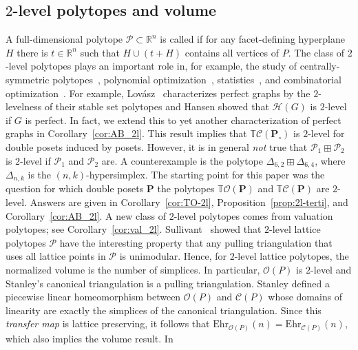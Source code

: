 \documentclass[11pt]{amsart}
\theoremstyle{definition}
\begin{document}
\subsection{$2$-level polytopes and volume}
A full-dimensional polytope ${\mathcal{P}} \subset {\mathbb{R}}^n$ is called
{\textbf{}} if for any facet-defining hyperplane $H$ there is $t
\in {\mathbb{R}}^n$ such that $H \cup (t + H)$ contains all vertices of ${P}$. The class
of $2$-level polytopes plays an important role in, for example, the study of
centrally-symmetric polytopes~\cite{WSZ,Hansen}, polynomial
optimization~\cite{GPT,gs14}, statistics~\cite{Sullivant}, and combinatorial
optimization~\cite{Schrijver}.  For
example, Lov\'{a}sz~\cite{Lovasz} characterizes perfect graphs by the
$2$-levelness of their stable set polytopes and Hansen showed that
${\mathcal{H}({G})}$ is $2$-level if $G$ is perfect. In fact, we extend this to yet
another characterization of perfect graphs in Corollary~\ref{cor:AB_2l}. This
result implies that ${{\mathbb{T}}{\mathcal{C}({{{{\mathbf{P}}_\circ}}})}}$ is $2$-level for double posets induced
by posets. However, it is in general \emph{not} true that
${{{{\mathcal{P}}_1} \boxplus {{\mathcal{P}}_2}}}$ is $2$-level if ${\mathcal{P}}_1$ and ${\mathcal{P}}_2$ are. A counterexample is the polytope
${{{\Delta_{6,2}} \boxplus {\Delta_{6,4}}}}$, where $\Delta_{n,k}$ is the
$(n,k)$-hypersimplex. The starting point for this paper was the question for
which double posets ${\mathbf{P}}$ the polytopes ${{\mathbb{T}}{\mathcal{O}({\mathbf{P}})}}$ and ${{\mathbb{T}}{\mathcal{C}({{{\mathbf{P}}}})}}$ are $2$-level.
Answers are given in Corollary~\ref{cor:TO-2l},
Proposition~\ref{prop:2l-terti}, and Corollary~\ref{cor:AB_2l}. A new class of
$2$-level polytopes comes from valuation polytopes; see
Corollary~\ref{cor:val_2l}. Sullivant~\cite[Thm.~2.4]{Sullivant} showed that
$2$-level lattice polytopes ${\mathcal{P}}$ have the interesting property that any
pulling triangulation that uses all lattice points in ${\mathcal{P}}$ is unimodular.
Hence, for $2$-level lattice polytopes, the normalized volume is the number of
simplices.  In particular, ${\mathcal{O}({P})}$ is $2$-level and Stanley's canonical
triangulation is a pulling triangulation. Stanley defined a piecewise linear
homeomorphism between ${\mathcal{O}({P})}$ and ${\mathcal{C}({P})}$ whose domains of linearity
are exactly the simplices of the canonical triangulation. Since this
\emph{transfer map} is lattice preserving, it follows that ${\mathrm{Ehr}}_{{\mathcal{O}({P})}}(n)
= {\mathrm{Ehr}}_{{\mathcal{C}({P})}}(n)$, which also implies the volume result. In
\end{document}
